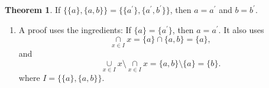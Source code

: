 \documentclass[fleqn]{beamer}
\theoremstyle{definition}
\newtheorem{myth}{Theorem}
\newenvironment{checklist}{
  \begin{enumerate}[\ding{51}]
    \addtolength{\itemsep}{-0.0\itemsep}}
  {\end{enumerate}}
\begin{document}
\begin{frame}

\begin{myth}  If  \(  \{\{a\}, \{a,b\} \} =   \{\{a^\prime\}, \{a^\prime,b^\prime\} \}\), 
  then \(a = a^\prime\) and  \(b = b^\prime\).
\end{myth}

\begin{checklist}

\item A proof uses the ingredients:  If \( \{a \} = \{a^\prime \}\), 
then \(a = a^\prime\). It also uses
\[
   \underset{x \in I}{\cap} x =  \{a\} \cap \{a,b\} = \{a\},
\]
and
\[
    \underset{x \in I}{\cup} x \setminus \underset{x \in I}{\cap} x  = \{a,b\} \setminus \{a\} = \{b\}.
\]
where \(I = \{\{a\}, \{a,b\}\} \).

\end{checklist}
\end{frame}
\end{document}
